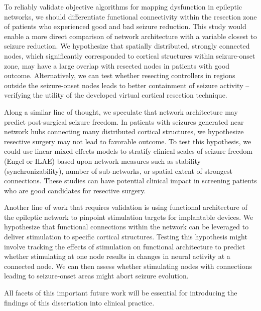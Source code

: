 To reliably validate objective algorithms for mapping dysfunction in epileptic networks, we should differentiate functional connectivity within the resection zone of patients who experienced good and bad seizure reduction. This study would enable a more direct comparison of network architecture with a variable closest to seizure reduction. We hypothesize that spatially distributed, strongly connected nodes, which significantly corresponded to cortical structures within seizure-onset zone, may have a large overlap with resected nodes in patients with good outcome. Alternatively, we can test whether resecting controllers in regions outside the seizure-onset nodes leads to better containment of seizure activity -- verifying the utility of the developed virtual cortical resection technique. 

Along a similar line of thought, we speculate that network architecture may predict post-surgical seizure freedom. In patients with seizures generated near network hubs connecting many distributed cortical structures, we hypothesize resective surgery may not lead to favorable outcome. To test this hypothesis, we could use linear mixed effects models to stratify clinical scales of seizure freedom (Engel or ILAE) based upon network measures such as stability (synchronizability), number of sub-networks, or spatial extent of strongest connections. These studies can have potential clinical impact in screening patients who are good candidates for resective surgery.

Another line of work that requires validation is using functional architecture of the epileptic network to pinpoint stimulation targets for implantable devices. We hypothesize that functional connections within the network can be leveraged to deliver stimulation to specific cortical structures. Testing this hypothesis might involve tracking the effects of stimulation on functional architecture to predict whether stimulating at one node results in changes in neural activity at a connected node. We can then assess whether stimulating nodes with connections leading to seizure-onset areas might abort seizure evolution.

All facets of this important future work will be essential for introducing the findings of this dissertation into clinical practice. 
